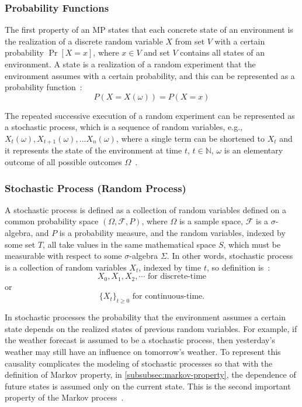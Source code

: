 \documentclass[../xlapes02]{subfiles}
\begin{document}
    \subsubsection{Probability Functions}\label{subsubsec:probability-functions}
    The first property of an MP states that each concrete state of an environment is the realization of a discrete random variable $X$ from set $V$ with a certain probability $\Pr\left[X=x\right]$, where $x \in V$ and set $V$ contains all states of an environment. A state is a realization of a random experiment that the environment assumes with a certain probability, and this can be represented as a probability function~\cite{FITMT25127}:
    \begin{equation}
        P(X = X(\omega)) = P(X = x)
    \end{equation}

    The repeated successive execution of a random experiment can be represented as a stochastic process, which is a sequence of random variables, e.g., $X_t(\omega), X_{t+1}(\omega), \ldots X_n(\omega)$, where a single term can be shortened to $X_t$ and it represents the state of the environment at time $t$, $t\in\mathbb{N}$, $\omega$ is an elementary outcome of all possible outcomes $\Omega$~\cite{inproceedings, rao2022foundations}.

    \subsubsection{Stochastic Process (Random Process)}\label{subsubsec:stochastic-process}
    A stochastic process is defined as a collection of random variables defined on a common probability space $(\Omega, \mathcal{F}, P)$, where $\Omega$ is a sample space, $\mathcal{F}$ is a $\sigma$-algebra, and $P$ is a probability measure, and the random variables, indexed by some set $T$, all take values in the same mathematical space $S$, which must be measurable with respect to some $\sigma$-algebra $\Sigma$. In other words, stochastic process is a collection of random variables $X_t$, indexed by time $t$, so definition is~\cite{enwiki:1148510872}:
    \begin{equation}
        X_0, X_1, X_2,\cdots \text{ for discrete-time}
    \end{equation}
    or
    \begin{equation}
        \{X_t\}_{t\geq0} \text{ for continuous-time.}
    \end{equation}

    In stochastic processes the probability that the environment assumes a certain state depends on the realized states of previous random variables. For example, if the weather forecast is assumed to be a stochastic process, then yesterday’s weather may still have an influence on tomorrow’s weather. To represent this causality complicates the modeling of stochastic processes so that with the definition of Markov property, in \cref{subsubsec:markov-property}, the dependence of future states is assumed only on the current state. This is the second important property of the Markov process~\cite{FITMT25127}.
\end{document}

